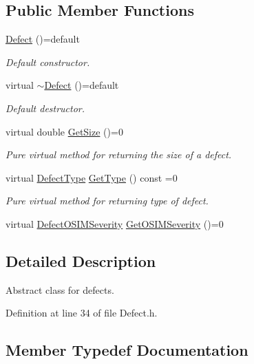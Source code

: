 \subsection*{Public Member Functions}
\begin{DoxyCompactItemize}
\item 
\hyperlink{classbeam__defects_1_1_defect_a3554dc33d88356193000174580bcc41a}{Defect} ()=default
\begin{DoxyCompactList}\small\item\em Default constructor. \end{DoxyCompactList}\item 
virtual \hyperlink{classbeam__defects_1_1_defect_aae70bb9ef052129a6bfc6b6d0de373b9}{$\sim$\+Defect} ()=default
\begin{DoxyCompactList}\small\item\em Default destructor. \end{DoxyCompactList}\item 
virtual double \hyperlink{classbeam__defects_1_1_defect_aa7c24d68d22e6d47dc1b9e8a9ad94c56}{Get\+Size} ()=0
\begin{DoxyCompactList}\small\item\em Pure virtual method for returning the size of a defect. \end{DoxyCompactList}\item 
virtual \hyperlink{group__defects_gae379b271bd5fb7ce92afe1abee917249}{Defect\+Type} \hyperlink{classbeam__defects_1_1_defect_aab237fd856c7ace882ead216c81574e6}{Get\+Type} () const =0
\begin{DoxyCompactList}\small\item\em Pure virtual method for returning type of defect. \end{DoxyCompactList}\item 
virtual \hyperlink{group__defects_gaed38c449f8cba57f35d1af04496a0711}{Defect\+O\+S\+I\+M\+Severity} \hyperlink{classbeam__defects_1_1_defect_a74824cc5cdb9d301d72089585ed8f1f2}{Get\+O\+S\+I\+M\+Severity} ()=0
\end{DoxyCompactItemize}


\subsection{Detailed Description}
Abstract class for defects. 

Definition at line 34 of file Defect.\+h.



\subsection{Member Typedef Documentation}
